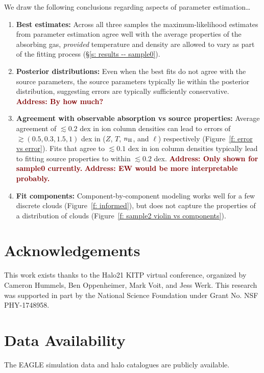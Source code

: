 \documentclass[fleqn,usenatbib]{mnras}
\newcommand{\todo}[1]{\textcolor{Maroon}{\textbf{Address: #1}}}
\begin{document}
We draw the following conclusions regarding aspects of parameter estimation\ldots
\begin{enumerate}
    \item \textbf{Best estimates:} Across all three samples the maximum-likelihood estimates from parameter estimation agree well with the average properties of the absorbing gas, \textit{provided} temperature and density are allowed to vary as part of the fitting process (\S\ref{s: results -- sample0}).
    \item \textbf{Posterior distributions:} Even when the best fits do not agree with the source parameters, the source parameters typically lie within the posterior distribution, suggesting errors are typically sufficiently conservative. \todo{By how much?}
    \item \textbf{Agreement with observable absorption vs source properties:} Average agreement of $\lesssim 0.2$ dex in ion column densities can lead to errors of $\gtrsim (0.5, 0.3, 1.5, 1)$ dex in ($Z$, $T$, $n_{\rm H}$, and $\ell$) respectively (Figure~\ref{f: error vs error}). Fits that agree to $\lesssim 0.1$ dex in ion column densities typically lead to fitting source properties to within $\lesssim 0.2$ dex. \todo{Only shown for sample0 currently.} \todo{EW would be more interpretable probably.}
    \item \textbf{Fit components:} Component-by-component modeling works well for a few discrete clouds (Figure~\ref{f: informed}), but does not capture the properties of a distribution of clouds (Figure~\ref{f: sample2 violin vs components}).
\end{enumerate}

\section*{Acknowledgements}

This work exists thanks to the Halo21 KITP virtual conference, organized by Cameron Hummels, Ben Oppenheimer, Mark Voit, and Jess Werk.
This research was supported in part by the National Science Foundation under Grant No. NSF PHY-1748958.

\section*{Data Availability}

The EAGLE simulation data \citep{EagleTeam2017} and halo catalogues \citep{McAlpine2016} are publicly available. 
\end{document}
